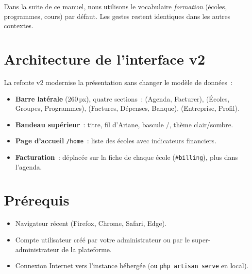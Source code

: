 Dans la suite de ce manuel, nous utilisons le vocabulaire \emph{formation} (écoles, programmes, cours) par défaut. Les gestes restent identiques dans les autres contextes.

\section{Architecture de l'interface v2}

La refonte v2 modernise la présentation sans changer le modèle de données~:

\begin{itemize}[leftmargin=*]
  \item \textbf{Barre latérale} (260\,px), quatre sections~:  (Agenda, Facturer),  (Écoles, Groupes, Programmes),  (Factures, Dépenses, Banque),  (Entreprise, Profil).
  \item \textbf{Bandeau supérieur}~: titre, fil d'Ariane, bascule /, thème clair/sombre.
  \item \textbf{Page d'accueil} \texttt{/home}~: liste des écoles avec indicateurs financiers.
  \item \textbf{Facturation}~: déplacée sur la fiche de chaque école (\texttt{\#billing}), plus dans l'agenda.
\end{itemize}

\section{Prérequis}

\begin{itemize}[leftmargin=*]
  \item Navigateur récent (Firefox, Chrome, Safari, Edge).
  \item Compte utilisateur créé par votre administrateur ou par le super-administrateur de la plateforme.
  \item Connexion Internet vers l'instance hébergée (ou \texttt{php artisan serve} en local).
\end{itemize}
